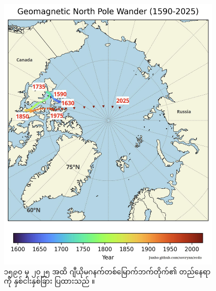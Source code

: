 \documentclass[10pt,twocolumn,letterpaper]{article}
\begin{document}
\begin{figure}[t]
\begin{center}
   \includegraphics[width=1\linewidth]{npw.jpg}
\end{center}
\caption{၁၅၉၀ မှ ၂၀၂၅ အထိ ဂျီယိုမဂနက်တစ်မြောက်ဘက်တိုက်၏ တည်နေရာကို နှစ်ငါးနှစ်ခြား ပြထားသည် \cite{142}။}
\label{fig:13}
\label{fig:onecol}
\end{figure}
\end{document}
